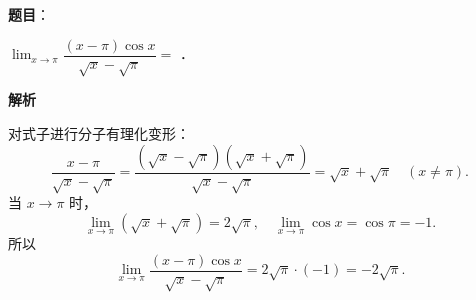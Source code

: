 \begin{answer}

\textbf{题目}：

$\lim_{x \to \pi} \dfrac{(x - \pi)\cos x}{\sqrt{x} - \sqrt{\pi}} =$ \underline{\hspace{3cm}}．

\textbf{解析}

对式子进行分子有理化变形：
\nopagebreak[4]
\[
\frac{x - \pi}{\sqrt{x} - \sqrt{\pi}} = \frac{(\sqrt{x} - \sqrt{\pi})(\sqrt{x} + \sqrt{\pi})}{\sqrt{x} - \sqrt{\pi}} = \sqrt{x} + \sqrt{\pi} \quad (x \neq \pi).
\]
当 $x \to \pi$ 时，
\nopagebreak[4]
\[
\lim_{x \to \pi} (\sqrt{x} + \sqrt{\pi}) = 2\sqrt{\pi}, \quad \lim_{x \to \pi} \cos x = \cos\pi = -1.
\]
所以
\nopagebreak[4]
\[
\lim_{x \to \pi} \frac{(x - \pi)\cos x}{\sqrt{x} - \sqrt{\pi}} = 2\sqrt{\pi} \cdot (-1) = -2\sqrt{\pi}.
\]


\end{answer}
